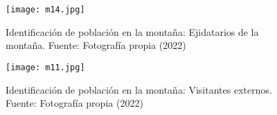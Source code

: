 \begin{figure}[h!]
\centering
  \texttt{[image: m14.jpg]}
  \caption{Identificación de población en la montaña: Ejidatarios de la montaña. Fuente: Fotografía propia (2022)}
  \label{m14}
\end{figure}

\begin{figure}[h!]
\centering
  \texttt{[image: m11.jpg]}
  \caption{Identificación de población en la montaña: Visitantes externos. Fuente: Fotografía propia (2022)}
  \label{m11}
\end{figure}


\newpage













